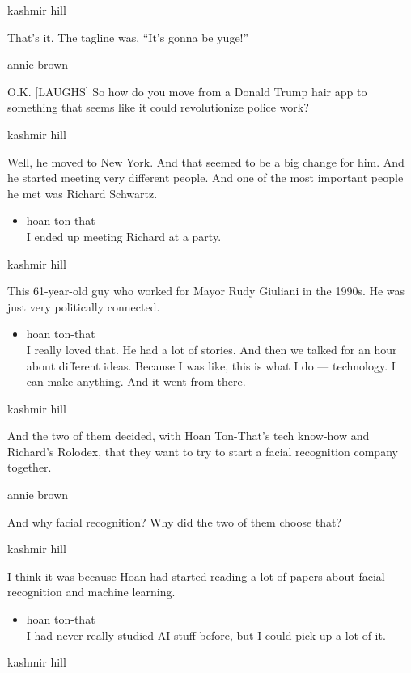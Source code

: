 kashmir hill

That's it. The tagline was, ``It's gonna be yuge!''

annie brown

O.K. {[}LAUGHS{]} So how do you move from a Donald Trump hair app to
something that seems like it could revolutionize police work?

kashmir hill

Well, he moved to New York. And that seemed to be a big change for him.
And he started meeting very different people. And one of the most
important people he met was Richard Schwartz.

\begin{itemize}
\tightlist
\item
  hoan ton-that\\
  I ended up meeting Richard at a party.
\end{itemize}

kashmir hill

This 61-year-old guy who worked for Mayor Rudy Giuliani in the 1990s. He
was just very politically connected.

\begin{itemize}
\tightlist
\item
  hoan ton-that\\
  I really loved that. He had a lot of stories. And then we talked for
  an hour about different ideas. Because I was like, this is what I do
  --- technology. I can make anything. And it went from there.
\end{itemize}

kashmir hill

And the two of them decided, with Hoan Ton-That's tech know-how and
Richard's Rolodex, that they want to try to start a facial recognition
company together.

annie brown

And why facial recognition? Why did the two of them choose that?

kashmir hill

I think it was because Hoan had started reading a lot of papers about
facial recognition and machine learning.

\begin{itemize}
\tightlist
\item
  hoan ton-that\\
  I had never really studied AI stuff before, but I could pick up a lot
  of it.
\end{itemize}

kashmir hill

